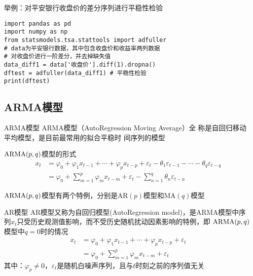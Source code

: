 \documentclass[t]{beamer}
\begin{document}
\begin{frame}[fragile]{举例：对平安银行收盘价的差分序列进行平稳性检验}
\begin{lstlisting}
import pandas as pd
import numpy as np
from statsmodels.tsa.stattools import adfuller
# data为平安银行数据，其中包含收盘价和收益率两列数据
# 对收盘价进行一阶差分，并去掉缺失值
data_diff1 = data['收盘价'].diff(1).dropna() 
dftest = adfuller(data_diff1) # 平稳性检验
print(dftest)
\end{lstlisting}
\end{frame}


\subsection{ARMA模型}
\begin{frame}[fragile]{ARMA模型}
ARMA模型（AutoRegression Moving Average）全
称是自回归移动平均模型，是目前最常用的拟合平稳时
间序列的模型

\begin{block}{${\rm ARMA}(p,q)$模型的形式}
    \[\begin{split}
 x_t&= \varphi_0+\varphi_1x_{t-1}+\cdots +\varphi_p x_{t-p}+\varepsilon_t-\theta_1\varepsilon_{t-1}-\cdots -\theta_q\varepsilon_{t-q}         \\
&=\varphi_0 + \sum_{m=1}^{p}\varphi_m x_{t-m}+\varepsilon_t-\sum_{n=1}^{q}\theta_n\varepsilon_{t-n} 
    \end{split} \]
\end{block}

${\rm ARMA}(p,q)$模型有两个特例，分别是AR$(p)$模型和MA$(q)$模型

\end{frame}


\begin{frame}[fragile]{AR模型}
    AR模型又称为自回归模型(AutoRegression model)，是ARMA模型中序列$x_t$只受历史观测值影响，而不受历史随机扰动因素影响的特例，即 ${\rm ARMA}(p,q)$模型中$q=0$时的情况
    \[\begin{split}
x_t&= \varphi_0+\varphi_1x_{t-1}+\cdots +\varphi_p x_{t-p}+\varepsilon_t   \\
&=\varphi_0 + \sum_{m=1}^{p}\varphi_m x_{t-m}+\varepsilon_t
    \end{split} \]
其中：$\varphi_p\ne 0$，$\varepsilon_t$是随机白噪声序列，且与$t$时刻之前的序列值无关
\end{frame}
\end{document}
